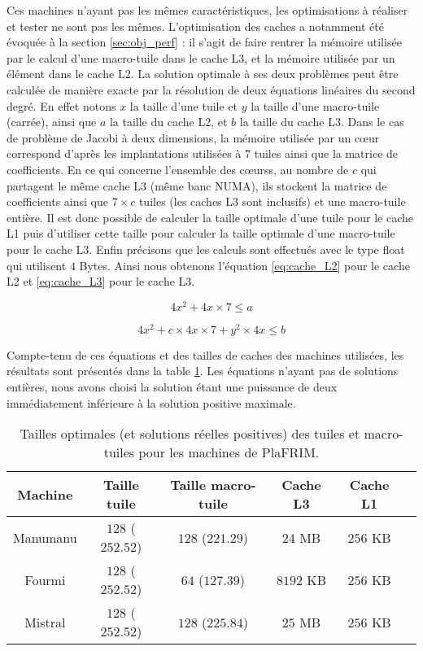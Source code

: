 Ces machines n'ayant pas les mêmes caractéristiques, les optimisations à réaliser et tester ne sont pas les mêmes. L'optimisation des caches a notamment été évoquée à la section \ref{sec:obj_perf} : il s'agit de faire rentrer la mémoire utilisée par le calcul d'une macro-tuile dans le cache L3, et la mémoire utilisée par un élément dans le cache L2. La solution optimale à ses deux problèmes peut être calculée de manière exacte par la résolution de deux équations linéaires du second degré. En effet notons $x$ la taille d'une tuile et $y$ la taille d'une macro-tuile (carrée), ainsi que $a$ la taille du cache L2, et $b$ la taille du cache L3. Dans le cas de problème de Jacobi à deux dimensions, la mémoire utilisée par un cœur correspond d'après les implantations utilisées à $7$ tuiles ainsi que la matrice de coefficients. En ce qui concerne l'ensemble des cœurss, au nombre de $c$ qui partagent le même cache L3 (même banc NUMA), ils stockent la matrice de coefficients ainsi que $7 \times c$ tuiles (les caches L3 sont inclusifs) et une macro-tuile entière. Il est donc possible de calculer la taille optimale d'une tuile pour le cache L1 puis d'utiliser cette taille pour calculer la taille optimale d'une macro-tuile pour le cache L3. Enfin précisons que les calculs sont effectués avec le type \textsf{float} qui utilisent $4$ Bytes. Ainsi nous obtenons l'équation \ref{eq:cache_L2} pour le cache L2 et \ref{eq:cache_L3} pour le cache L3.

\begin{equation}
\label{eq:cache_L2}
4x^2 + 4x \times 7 \leq a
\end{equation}

\begin{equation}
\label{eq:cache_L3}
4x^2 + c \times 4x \times 7 + y^2 \times 4x \leq b
\end{equation}

Compte-tenu de ces équations et des tailles de caches des machines utilisées, les résultats sont présentés dans la table \ref{tab:size_cach}. Les équations n'ayant pas de solutions entières, nous avons choisi la solution étant une puissance de deux immédiatement inférieure à la solution positive maximale.

\begin{table}
{
\caption{Tailles optimales (et solutions réelles positives) des tuiles et macro-tuiles pour les machines de \textsf{PlaFRIM}.}
\label{tab:size_cach}
}
{
\begin{tabular}{||c||c|c|c|c|c||}
\hline
Machine & Taille tuile & Taille macro-tuile & Cache L3 & Cache L1 \\
\hline
\hline
Manumanu & $128$ ($252.52$) & $128$ ($221.29$) & $24$ MB & $256$ KB \\
Fourmi & $128$ ($252.52$) & $64$ ($127.39$) & $8192$ KB & $256$ KB \\
Mistral & $128$ ($252.52$) & $128$ ($225.84$) & $25$ MB & $256$ KB \\
\hline
\end{tabular}
}
\end{table} 



